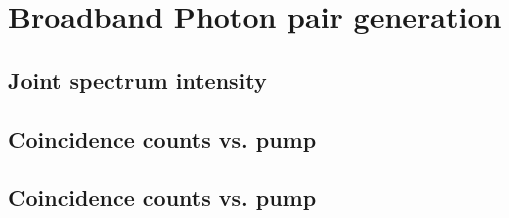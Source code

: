 \chapter{Broadband Photon pair generation}
\section{Joint spectrum intensity}
\section{Coincidence counts vs. pump}
\section{Coincidence counts vs. pump}
